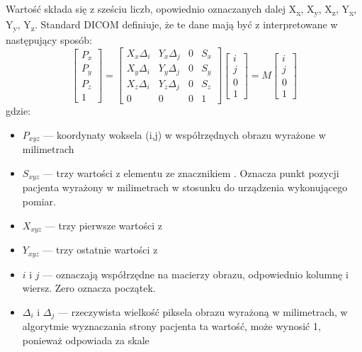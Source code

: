 \par
Wartość  składa się z sześciu liczb, opowiednio oznaczanych dalej X\textsubscript{x}, X\textsubscript{y}, X\textsubscript{z}, Y\textsubscript{x}, Y\textsubscript{y}, Y\textsubscript{z}.
Standard DICOM definiuje, że te dane mają być z interpretowane w następujący sposób:
\[
    \begin{bmatrix}
        P_x \\ P_y \\ P_z \\ 1
    \end{bmatrix}
    =
    \begin{bmatrix}
        X_x\Delta_i & Y_x\Delta_j & 0 & S_x \\
        X_y\Delta_i & Y_y\Delta_j & 0 & S_y \\
        X_z\Delta_i & Y_z\Delta_j & 0 & S_z \\
        0           & 0           & 0 & 1
    \end{bmatrix}
    \begin{bmatrix}
        i \\ j \\ 0 \\ 1
    \end{bmatrix}
    =
    M
    \begin{bmatrix}
        i \\ j \\ 0 \\ 1
    \end{bmatrix}
\]
gdzie:
\begin{itemize}
    \item $P_{xyz}$ --- koordynaty woksela (i,j) w współrzędnych obrazu wyrażone w milimetrach
    \item $S_{xyz}$ --- trzy wartości z elementu ze znacznikiem . Oznacza punkt pozycji pacjenta wyrażony w milimetrach w stosunku do urządzenia wykonującego pomiar.
    \item $X_{xyz}$ --- trzy pierwsze wartości z 
    \item $Y_{xyz}$ --- trzy ostatnie wartości z 
    \item $i$ i $j$ --- oznaczają współrzędne na macierzy obrazu, odpowiednio kolumnę i wiersz. Zero oznacza początek.
    \item $\Delta_i$ i $\Delta_j$ --- rzeczywista wielkość piksela obrazu wyrażoną w milimetrach, w algorytmie wyznaczania strony pacjenta ta wartość, może wynosić 1, ponieważ odpowiada za skale
\end{itemize}

